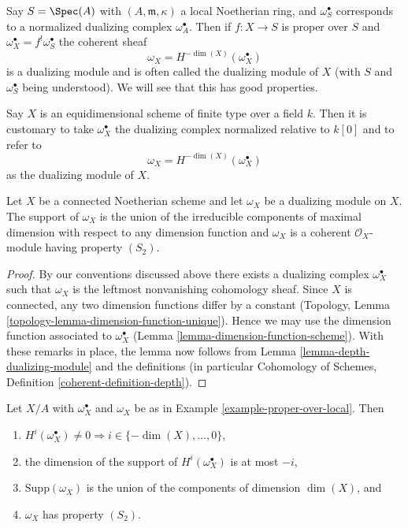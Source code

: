 \begin{example}
\label{example-proper-over-local}
Say $S = \Spec(A)$ with $(A, \mathfrak m, \kappa)$
a local Noetherian ring, and $\omega_S^\bullet$ corresponds to
a normalized dualizing complex $\omega_A^\bullet$. Then if
$f : X \to S$ is proper over $S$ and $\omega_X^\bullet = f^!\omega_S^\bullet$
the coherent sheaf
$$
\omega_X = H^{-\dim(X)}(\omega_X^\bullet)
$$
is a dualizing module and is often called the dualizing module
of $X$ (with $S$ and $\omega_S^\bullet$ being understood). We will
see that this has good properties.
\end{example}

\begin{example}
\label{example-equidimensional-over-field}
Say $X$ is an equidimensional scheme of finite type
over a field $k$. Then it is customary to take
$\omega_X^\bullet$ the dualizing complex normalized relative to $k[0]$
and to refer to
$$
\omega_X = H^{-\dim(X)}(\omega_X^\bullet)
$$
as the dualizing module of $X$.
\end{example}

\begin{lemma}
\label{lemma-dualizing-module}
Let $X$ be a connected Noetherian scheme and let $\omega_X$ be a dualizing
module on $X$. The support of $\omega_X$ is the union of the irreducible
components of maximal dimension with respect to any dimension function
and $\omega_X$ is a coherent $\mathcal{O}_X$-module having property $(S_2)$.
\end{lemma}

\begin{proof}
By our conventions discussed above there exists a dualizing complex
$\omega_X^\bullet$ such that $\omega_X$ is the leftmost nonvanishing
cohomology sheaf. Since $X$ is connected, any two dimension functions
differ by a constant
(Topology, Lemma \ref{topology-lemma-dimension-function-unique}).
Hence we may use the
dimension function associated to $\omega_X^\bullet$
(Lemma \ref{lemma-dimension-function-scheme}).
With these remarks in place, the lemma now
follows from Lemma \ref{lemma-depth-dualizing-module}
and the definitions (in particular
Cohomology of Schemes, Definition \ref{coherent-definition-depth}).
\end{proof}

\begin{lemma}
\label{lemma-vanishing-good-dualizing}
Let $X/A$ with $\omega_X^\bullet$ and $\omega_X$ be as in
Example \ref{example-proper-over-local}. Then
\begin{enumerate}
\item $H^i(\omega_X^\bullet) \not = 0 \Rightarrow
i \in \{-\dim(X), \ldots, 0\}$,
\item the dimension of the support of $H^i(\omega_X^\bullet)$ is at most $-i$,
\item $\text{Supp}(\omega_X)$ is the union of
the components of dimension $\dim(X)$, and
\item $\omega_X$ has property $(S_2)$.
\end{enumerate}
\end{lemma}

